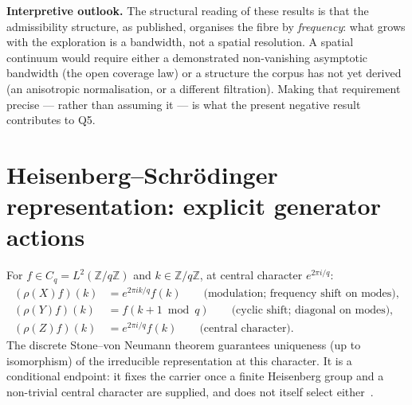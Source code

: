 \documentclass[11pt,a4paper]{article}
\theoremstyle{plain}
\theoremstyle{definition}
\theoremstyle{remark}
\newcommand{\Cq}{C_q}
\newcommand{\Z}{\mathbb{Z}}
\begin{document}
    \medskip
    \textbf{Interpretive outlook.}
    The structural reading of these results is that the admissibility structure, as published,
    organises the fibre by \emph{frequency}: what grows with the exploration is a bandwidth, not a
    spatial resolution.
    A spatial continuum would require either a demonstrated non-vanishing asymptotic bandwidth (the
    open coverage law) or a structure the corpus has not yet derived (an anisotropic normalisation, or
    a different filtration).
    Making that requirement precise --- rather than assuming it --- is what the present negative
    result contributes to Q5.

  \appendix

  \section{Heisenberg--Schrödinger representation: explicit generator actions}
  \label{app:weil}

  For $f \in \Cq = L^2(\Z/q\Z)$ and $k \in \Z/q\Z$, at central character $e^{2\pi i/q}$:
  \begin{align*}
    (\rho(X) f)(k) &= e^{2\pi i k/q} f(k) \qquad \text{(modulation; frequency shift on modes)},\\
    (\rho(Y) f)(k) &= f(k+1 \bmod q) \qquad \text{(cyclic shift; diagonal on modes)},\\
    (\rho(Z) f)(k) &= e^{2\pi i/q} f(k) \qquad \text{(central character)}.
  \end{align*}
  The discrete Stone--von Neumann theorem guarantees uniqueness (up to isomorphism) of the irreducible
  representation at this character.
  It is a conditional endpoint: it fixes the carrier once a finite Heisenberg group and a non-trivial
  central character are supplied, and does not itself select
  either~\cite{Beau2026m,Beau2026HeisenbergStructure}.

  
  
\end{document}
